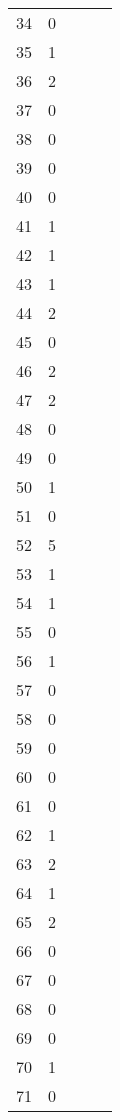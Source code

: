 \begin{center}
\begin{table}[H]
\begin{tabular}{ccccc}
\num{   34} & \num{    0} \\
\num{   35} & \num{    1} \\
\num{   36} & \num{    2} \\
\num{   37} & \num{    0} \\
\num{   38} & \num{    0} \\
\num{   39} & \num{    0} \\
\num{   40} & \num{    0} \\
\num{   41} & \num{    1} \\
\num{   42} & \num{    1} \\
\num{   43} & \num{    1} \\
\num{   44} & \num{    2} \\
\num{   45} & \num{    0} \\
\num{   46} & \num{    2} \\
\num{   47} & \num{    2} \\
\num{   48} & \num{    0} \\
\num{   49} & \num{    0} \\
\num{   50} & \num{    1} \\
\num{   51} & \num{    0} \\
\num{   52} & \num{    5} \\
\num{   53} & \num{    1} \\
\num{   54} & \num{    1} \\
\num{   55} & \num{    0} \\
\num{   56} & \num{    1} \\
\num{   57} & \num{    0} \\
\num{   58} & \num{    0} \\
\num{   59} & \num{    0} \\
\num{   60} & \num{    0} \\
\num{   61} & \num{    0} \\
\num{   62} & \num{    1} \\
\num{   63} & \num{    2} \\
\num{   64} & \num{    1} \\
\num{   65} & \num{    2} \\
\num{   66} & \num{    0} \\
\num{   67} & \num{    0} \\
\num{   68} & \num{    0} \\
\num{   69} & \num{    0} \\
\num{   70} & \num{    1} \\
\num{   71} & \num{    0} \\

\end{tabular}
\end{table}
\end{center}
